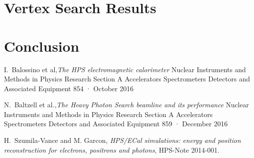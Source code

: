 \documentclass[12pt]{report}
\begin{document}
%


\chapter{Vertex Search Results}
\chapter{Conclusion}


\begin{thebibliography}{99}

  
                                              
                                              
 I.~Balossino et al,{\it The HPS electromagnetic calorimeter} Nuclear Instruments and Methods in Physics Research Section A Accelerators Spectrometers Detectors and Associated Equipment 854 · October 2016    

N.~Baltzell et al.,{\it The Heavy Photon Search beamline and its performance} Nuclear Instruments and Methods in Physics Research Section A Accelerators Spectrometers Detectors and Associated Equipment 859 · December 2016                                          

 H.~Szumila-Vance and M. Garcon, {\it HPS/ECal simulations: energy and
position reconstruction for electrons, positrons and photons}, HPS-Note 2014-001.


\end{thebibliography}
\end{document}
